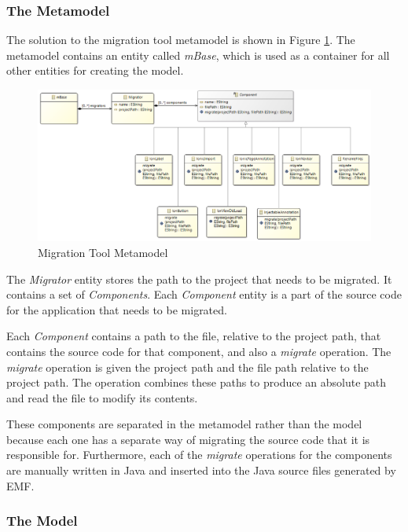 \documentclass[conference]{IEEEtran}
\begin{document}
\subsubsection*{The Metamodel}

The solution to the migration tool metamodel is shown in Figure \ref{fig:metamodel}. The metamodel contains an entity called \textit{mBase}, which is used as a container for all other entities for creating the model.

\begin{figure}[htbp]
\centerline{\includegraphics[width=\linewidth,keepaspectratio]{metamodel.png}}
\caption{Migration Tool Metamodel}
\label{fig:metamodel}
\end{figure}

The \textit{Migrator} entity stores the path to the project that needs to be migrated. It contains a set of \textit{Components}. Each \textit{Component} entity is a part of the source code for the application that needs to be migrated.

Each \textit{Component} contains a path to the file, relative to the project path, that contains the source code for that component, and also a \textit{migrate} operation. The \textit{migrate} operation is given the project path and the file path relative to the project path. The operation combines these paths to produce an absolute path and read the file to modify its contents.

These components are separated in the metamodel rather than the model because each one has a separate way of migrating the source code that it is responsible for. Furthermore, each of the \textit{migrate} operations for the components are manually written in Java and inserted into the Java source files generated by EMF.

\subsubsection*{The Model}
\end{document}
